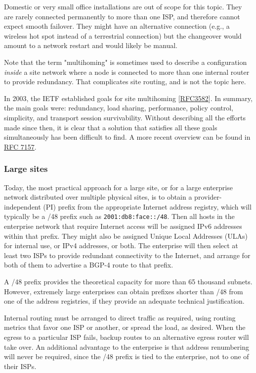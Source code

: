 \documentclass[
]{article}
\begin{document}
Domestic or very small office installations are out of scope for this
topic. They are rarely connected permanently to more than one ISP, and
therefore cannot expect smooth failover. They might have an alternative
connection (e.g., a wireless hot spot instead of a terrestrial
connection) but the changeover would amount to a network restart and
would likely be manual.

Note that the term "multihoming" is sometimes used to describe a
configuration \emph{inside} a site network where a node is connected to
more than one internal router to provide redundancy. That complicates
site routing, and is not the topic here.

In 2003, the IETF established goals for site multihoming
{[}\href{https://www.rfc-editor.org/info/rfc3582}{RFC3582}{]}. In
summary, the main goals were: redundancy, load sharing, performance,
policy control, simplicity, and transport session survivability. Without
describing all the efforts made since then, it is clear that a solution
that satisfies all these goals simultaneously has been difficult to
find. A more recent overview can be found in
\href{https://www.rfc-editor.org/info/rfc7157}{RFC 7157}.

\subsubsection{Large sites}\label{large-sites}

Today, the most practical approach for a large site, or for a large
enterprise network distributed over multiple physical sites, is to
obtain a provider-independent (PI) prefix from the appropriate Internet
address registry, which will typically be a /48 prefix such as
\texttt{2001:db8:face::/48}. Then all hosts in the enterprise network
that require Internet access will be assigned IPv6 addresses within that
prefix. They might also be assigned Unique Local Addresses (ULAs) for
internal use, or IPv4 addresses, or both. The enterprise will then
select at least two ISPs to provide redundant connectivity to the
Internet, and arrange for both of them to advertise a BGP-4 route to
that prefix.

A /48 prefix provides the theoretical capacity for more than 65 thousand
subnets. However, extremely large enterprises can obtain prefixes
shorter than /48 from one of the address registries, if they provide an
adequate technical justification.

Internal routing must be arranged to direct traffic as required, using
routing metrics that favor one ISP or another, or spread the load, as
desired. When the egress to a particular ISP fails, backup routes to an
alternative egress router will take over. An additional advantage to the
enterprise is that address renumbering will never be required, since the
/48 prefix is tied to the enterprise, not to one of their ISPs.
\end{document}
